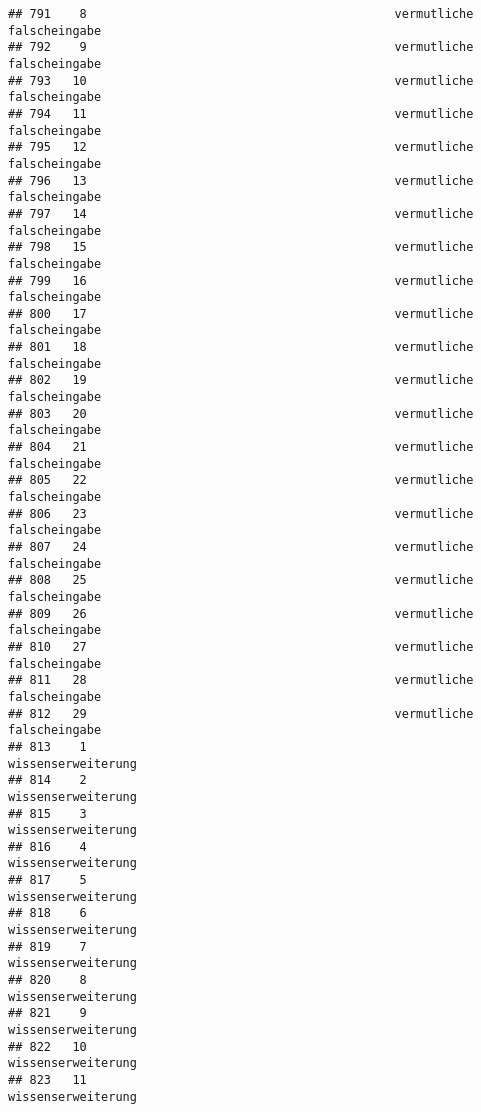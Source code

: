 \documentclass[
]{article}
\begin{document}
\begin{verbatim}
## 791    8                                           vermutliche falscheingabe
## 792    9                                           vermutliche falscheingabe
## 793   10                                           vermutliche falscheingabe
## 794   11                                           vermutliche falscheingabe
## 795   12                                           vermutliche falscheingabe
## 796   13                                           vermutliche falscheingabe
## 797   14                                           vermutliche falscheingabe
## 798   15                                           vermutliche falscheingabe
## 799   16                                           vermutliche falscheingabe
## 800   17                                           vermutliche falscheingabe
## 801   18                                           vermutliche falscheingabe
## 802   19                                           vermutliche falscheingabe
## 803   20                                           vermutliche falscheingabe
## 804   21                                           vermutliche falscheingabe
## 805   22                                           vermutliche falscheingabe
## 806   23                                           vermutliche falscheingabe
## 807   24                                           vermutliche falscheingabe
## 808   25                                           vermutliche falscheingabe
## 809   26                                           vermutliche falscheingabe
## 810   27                                           vermutliche falscheingabe
## 811   28                                           vermutliche falscheingabe
## 812   29                                           vermutliche falscheingabe
## 813    1                                                  wissenserweiterung
## 814    2                                                  wissenserweiterung
## 815    3                                                  wissenserweiterung
## 816    4                                                  wissenserweiterung
## 817    5                                                  wissenserweiterung
## 818    6                                                  wissenserweiterung
## 819    7                                                  wissenserweiterung
## 820    8                                                  wissenserweiterung
## 821    9                                                  wissenserweiterung
## 822   10                                                  wissenserweiterung
## 823   11                                                  wissenserweiterung

\end{verbatim}
\end{document}
